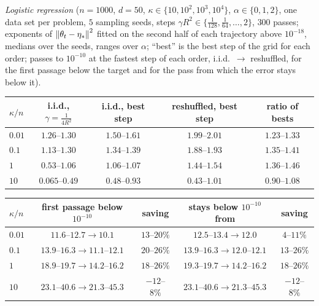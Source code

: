 \emph{Logistic regression} ($n=1000$, $d=50$, $\kappa\in\{10,10^2,10^3,10^4\}$, $\alpha\in\{0,1,2\}$, one data set per problem, $5$ sampling seeds, steps $\gamma R^2\in\{\frac1{128},\frac1{64},\dots,2\}$, $300$ passes; exponents of $\left\|\theta_t-\eta_\ast\right\|^2$ fitted on the second half of each trajectory above $10^{-18}$, medians over the seeds, ranges over $\alpha$; ``best'' is the best step of the grid for each order; passes to $10^{-10}$ at the fastest step of each order, i.i.d.\ $\to$ reshuffled, for the first passage below the target and for the pass from which the error stays below it).
\begin{center}
\footnotesize
\begin{tabular}{@{}lcccc@{}}
\toprule
$\kappa/n$ & i.i.d., $\gamma=\frac1{4R^2}$ & i.i.d., best step & reshuffled, best step & ratio of bests \\
\midrule
$0.01$ & $1.26$--$1.30$ & $1.50$--$1.61$ & $1.99$--$2.01$ & $1.23$--$1.33$ \\
$0.1$ & $1.13$--$1.30$ & $1.34$--$1.39$ & $1.88$--$1.93$ & $1.35$--$1.41$ \\
$1$ & $0.53$--$1.06$ & $1.06$--$1.07$ & $1.44$--$1.54$ & $1.36$--$1.46$ \\
$10$ & $0.065$--$0.49$ & $0.48$--$0.93$ & $0.43$--$1.01$ & $0.90$--$1.08$ \\
\bottomrule
\end{tabular}

\smallskip
\begin{tabular}{@{}lcccc@{}}
\toprule
$\kappa/n$ & first passage below $10^{-10}$ & saving & stays below $10^{-10}$ from & saving \\
\midrule
$0.01$ & $11.6$--$12.7\to10.1$ & $13$--$20\%$ & $12.5$--$13.4\to12.0$ & $4$--$11\%$ \\
$0.1$ & $13.9$--$16.3\to11.1$--$12.1$ & $20$--$26\%$ & $13.9$--$16.3\to12.0$--$12.1$ & $13$--$26\%$ \\
$1$ & $18.9$--$19.7\to14.2$--$16.2$ & $18$--$26\%$ & $19.3$--$19.7\to14.2$--$16.2$ & $18$--$26\%$ \\
$10$ & $23.1$--$40.6\to21.3$--$45.3$ & $-12$--$8\%$ & $23.1$--$40.6\to21.3$--$45.3$ & $-12$--$8\%$ \\
\bottomrule
\end{tabular}
\end{center}
